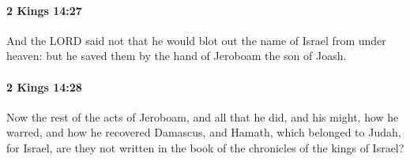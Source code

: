 		\paragraph{2 Kings 14:27} %
			\label{2KINGS-14-27}

			And the LORD said not that he would blot out the name of Israel from under heaven: but he saved them by the hand of Jeroboam the son of Joash.


		\paragraph{2 Kings 14:28} %
			\label{2KINGS-14-28}

			Now the rest of the acts of Jeroboam, and all that he did, and his might, how he warred, and how he recovered Damascus, and Hamath, which belonged to Judah, for Israel, are they not written in the book of the chronicles of the kings of Israel?

